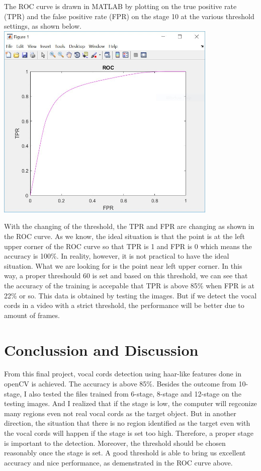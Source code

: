 \documentclass[11pt]{article}
\makeatletter
\def\maxwidth{\ifdim\Gin@nat@width>\linewidth\linewidth
    \else\Gin@nat@width\fi}
\let\Oldincludegraphics\includegraphics
\renewcommand{\includegraphics}[1]{\Oldincludegraphics[width=.8\maxwidth]{#1}}
\makeatother
\begin{document}
    The ROC curve is drawn in MATLAB by plotting on the true positive rate
(TPR) and the false positive rate (FPR) on the stage 10 at the various
threshold settings, as shown below. \includegraphics{ROC.png}

With the changing of the threshold, the TPR and FPR are changing as
shown in the ROC curve. As we know, the ideal situation is that the
point is at the left upper corner of the ROC curve so that TPR is 1 and
FPR is 0 which means the accuracy is 100\%. In reality, however, it is
not practical to have the ideal situation. What we are looking for is
the point near left upper corner. In this way, a proper threshould 60 is
set and based on this threshold, we can see that the accuracy of the
training is accepable that TPR is above 85\% when FPR is at 22\% or so.
This data is obtained by testing the images. But if we detect the vocal
cords in a video with a strict threshold, the performance will be better
due to amount of frames.

    \hypertarget{conclussion-and-discussion}{%
\section{Conclussion and Discussion}\label{conclussion-and-discussion}}

    From this final project, vocal cords detection using haar-like features
done in openCV is achieved. The accuracy is above 85\%. Besides the
outcome from 10-stage, I also tested the files trained from 6-stage,
8-stage and 12-stage on the testing images. And I realized that if the
stage is low, the computer will regconize many regions even not real
vocal cords as the target object. But in another direction, the
situation that there is no region identified as the target even with the
vocal cords will happen if the stage is set too high. Therefore, a
proper stage is important to the detection. Moreover, the threshold
should be chosen reasonably once the stage is set. A good threshold is
able to bring us excellent accuracy and nice performance, as
demenstrated in the ROC curve above.
\end{document}
